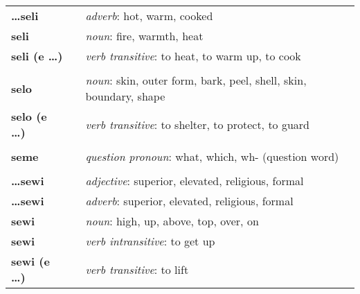 \begin{supertabular}{p{2,5cm}|ll}
    \textbf{\dots seli}          &  & \textit{adverb}: hot, warm, cooked                                                                         \\
    \textbf{seli}                &  & \textit{noun}: fire, warmth, heat                                                                          \\
    \textbf{seli (e \dots)}      &  & \textit{verb transitive}: to heat, to warm up, to cook                                                     \\
                                 &  &                                                                                                            \\
    \textbf{selo}                &  & \textit{noun}: skin, outer form, bark, peel, shell, skin, boundary, shape                                  \\
    \textbf{selo (e \dots)}      &  & \textit{verb transitive}: to shelter, to protect, to guard                                                 \\
                                 &  &                                                                                                            \\
    \textbf{seme}                &  & \textit{question pronoun}: what, which, wh- (question word)                                                \\
                                 &  &                                                                                                            \\
    \textbf{\dots sewi}          &  & \textit{adjective}: superior, elevated, religious, formal                                                  \\
    \textbf{\dots sewi}          &  & \textit{adverb}: superior, elevated, religious, formal                                                     \\
    \textbf{sewi}                &  & \textit{noun}: high, up, above, top, over, on                                                              \\
    \textbf{sewi}                &  & \textit{verb intransitive}: to get up                                                                      \\
    \textbf{sewi (e \dots)}      &  & \textit{verb transitive}: to lift                                                                          \\

\end{supertabular}
